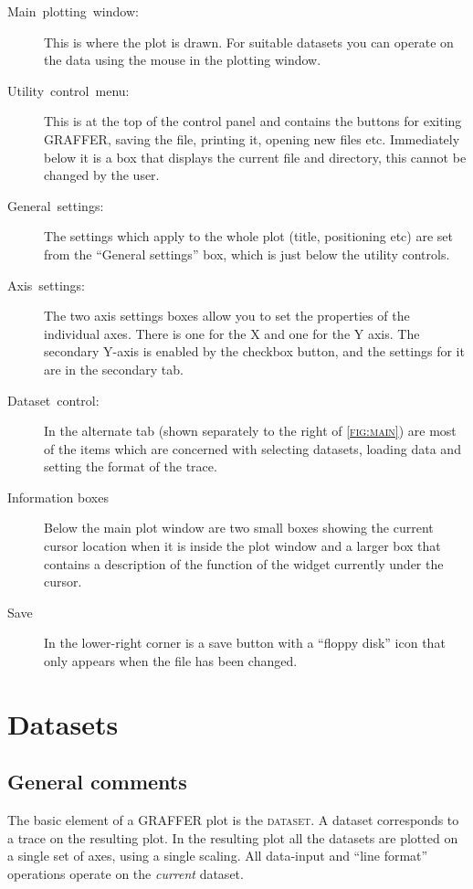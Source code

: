\documentclass[11pt,twoside,english]{article}
\begin{document}
\begin{description}
\item [Main~plotting~window:]This is where the plot is drawn. For
  suitable datasets you can operate on the data using the mouse in the
  plotting window.
\item [Utility~control~menu:]This is at the top of the control panel
  and contains the buttons for exiting GRAFFER, saving the file,
  printing it, opening new files etc. Immediately below it is a box
  that displays the current file and directory, this cannot be changed
  by the user.
\item [General~settings:]The settings which apply to the whole plot
  (title, positioning etc) are set from the {}``General settings'' box,
  which is just below the utility controls.
\item [Axis~settings:]The two axis settings boxes allow you to set the
  properties of the individual axes. There is one for the X and one for
  the Y axis. The secondary Y-axis is enabled by the checkbox button,
  and the settings for it are in the secondary tab.
\item [Dataset~control:]In the alternate tab (shown separately to the
  right of \textsc{\autoref{fig:main}}) are most of the items which are
  concerned with selecting datasets, loading data and setting the
  format of the trace.

\item[Information boxes] Below the main plot window are two small boxes
  showing the current cursor location when it is inside the plot window
  and a larger box that contains a description of the function of the
  widget currently under the cursor.

\item[Save] In the lower-right corner is a save button with a ``floppy
  disk'' icon that only appears when the file has been changed.
\end{description}

\section{Datasets}


\subsection{General comments}

The basic element of a GRAFFER plot is the \textsc{dataset}. A dataset
corresponds to a trace on the resulting plot. In the resulting plot all
the datasets are plotted on a single set of axes, using a single
scaling. All data-input and {}``line format'' operations operate on the
\textit{current} dataset.
\end{document}
